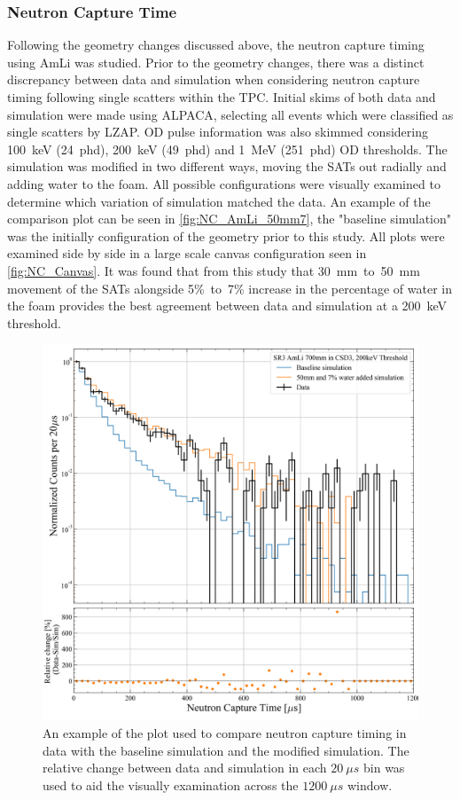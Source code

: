 \subsubsection{Neutron Capture Time}
Following the geometry changes discussed above, the neutron capture timing using AmLi was studied. Prior to the geometry changes, there was a distinct discrepancy between data and simulation when considering neutron capture timing following single scatters within the TPC. Initial skims of both data and simulation were made using ALPACA, selecting all events which were classified as single scatters by LZAP. OD pulse information was also skimmed considering 100~keV (24~phd), 200~keV (49~phd) and 1~MeV (251~phd) OD thresholds.
The simulation was modified in two different ways, moving the SATs out radially and adding water to the foam. All possible configurations were visually examined to determine which variation of simulation matched the data. An example of the comparison plot can be seen in \autoref{fig:NC_AmLi_50mm7}, the "baseline simulation" was the initially configuration of the geometry prior to this study. All plots were examined side by side in a large scale canvas configuration seen in \autoref{fig:NC_Canvas}. It was found that from this study that 30~mm~to~50~mm movement of the SATs alongside 5\%~to~7\% increase in the percentage of water in the foam provides the best agreement between data and simulation at a 200~keV threshold.
\begin{figure}
	\centering
	\includegraphics[width=0.8\linewidth]{figures/VetoEfficiency/movedSAT50mm_7percentWater_AmLi_CSD3_Z700mm_200keV_Ratio.png}
	\caption{An example of the plot used to compare neutron capture timing in data with the baseline simulation and the modified simulation. The relative change between data and simulation in each $20~\mu s$ bin was used to aid the visually examination across the $1200~\mu s$ window.}
	\label{fig:NC_AmLi_50mm7}
\end{figure}
